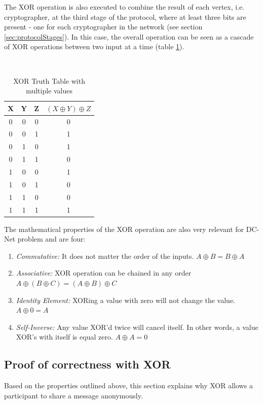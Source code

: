 The XOR operation is also executed to combine the result of each vertex, i.e. cryptographer, at the third stage of the protocol, where at least three bits are present - one for each cryptographer in the network (see section \ref{sec:protocolStages}). In this case, the overall operation can be seen as a cascade of XOR operations between two input at a time (table \ref{table:XORextended}).


\begin{table}[h!]
\centering
\caption{XOR Truth Table with multiple values}
~\\[0.5ex]
\begin{tabular}{|| c | c | c | c ||} 
 \hline
 X & Y & Z & $(X \oplus Y) \oplus Z$ \\ [0.ex] 
 \hline\hline
 0 & 0 & 0 & 0 \\ 
 0 & 0 & 1 & 1 \\
 0 & 1 & 0 & 1 \\
 0 & 1 & 1 & 0 \\
 1 & 0 & 0 & 1 \\
 1 & 0 & 1 & 0 \\
 1 & 1 & 0 & 0 \\ 
 1 & 1 & 1 & 1 \\ [1ex]
 \hline
\end{tabular}
\label{table:XORextended}
\end{table}

The mathematical properties of the XOR operation are also very relevant for DC-Net problem \cite{Lewin} and are four:
\begin{enumerate} \label{sec:XORproperties} \label{sec:xorproperties}
    \item \textit{Commutative:} It does not matter the order of the inputs. $A \oplus B = B \oplus A$
    \item \textit{Associative:} XOR operation can be chained in any order $A \oplus (B \oplus C) = (A \oplus B) \oplus C$
    \item \textit{Identity Element:} XORing a value with zero will not change the value. $A \oplus 0 = A$
    \item \textit{Self-Inverse:} Any value XOR'd twice will cancel itself. In other words, a value XOR's with itself is equal zero. $A \oplus A = 0$
\end{enumerate}

\subsection{Proof of correctness with XOR} \label{sec:xorDemonstration}
Based on the properties outlined above, this section explains why XOR allows a participant to share a message anonymously. \newline

